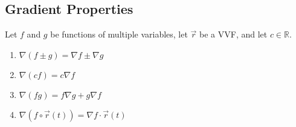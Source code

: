 \subsection{Gradient Properties}
\noindent
Let $f$ and $g$ be functions of multiple variables, let $\vec{r}$ be a VVF, and let $c \in \mathbb{R}$.
\begin{enumerate}
	\item $\nabla(f \pm g) = \nabla f \pm \nabla g$
	\item $\nabla(cf) = c\nabla f$
	\item $\nabla(fg) = f\nabla g + g\nabla f$
	\item $\nabla(f\circ\vec{r}(t)) = \nabla f \cdot \vec{r}(t)$
\end{enumerate}
